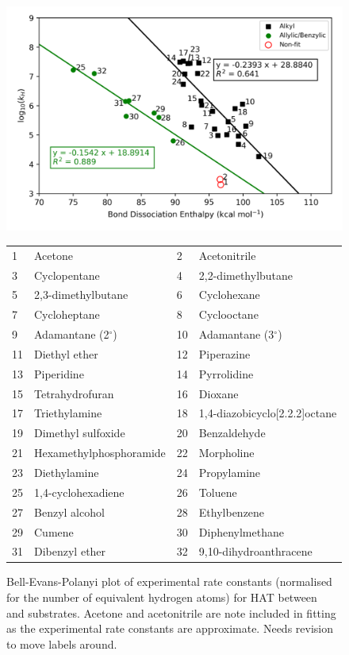 \begin{figure}[H]
  \centering
  \includegraphics[width=\textwidth]{figures/bde-bep}
\begin{tabularx}{\textwidth}{| l X l X |}
  \hline
  1 & Acetone & 2 & Acetonitrile \\
  3 & Cyclopentane & 4 & 2,2-dimethylbutane \\
  5 & 2,3-dimethylbutane & 6 & Cyclohexane \\
  7 & Cycloheptane & 8 & Cyclooctane \\
  9 & Adamantane (2$^\circ$) & 10 & Adamantane (3$^\circ$) \\
  11 & Diethyl ether & 12 & Piperazine \\
  13 & Piperidine & 14 & Pyrrolidine \\
  15 & Tetrahydrofuran & 16 & Dioxane \\
  17 & Triethylamine & 18 & 1,4-diazobicyclo[2.2.2]octane \\
  19 & Dimethyl sulfoxide & 20 & Benzaldehyde \\
  21 & Hexamethylphosphoramide & 22 & Morpholine \\
  23 & Diethylamine & 24 & Propylamine \\
  25 & 1,4-cyclohexadiene & 26 & Toluene \\
  27 & Benzyl alcohol & 28 & Ethylbenzene \\
  29 & Cumene & 30 & Diphenylmethane \\
  31 & Dibenzyl ether & 32 & 9,10-dihydroanthracene \\
  \hline
\end{tabularx}
  \caption{Bell-Evans-Polanyi plot of experimental rate constants (normalised for the number of equivalent hydrogen atoms) for HAT between \cumo~ and substrates. Acetone and acetonitrile are note included in fitting as the experimental rate constants are approximate. Needs revision to move labels around.}
\label{fig:bde-bep}
\end{figure}

